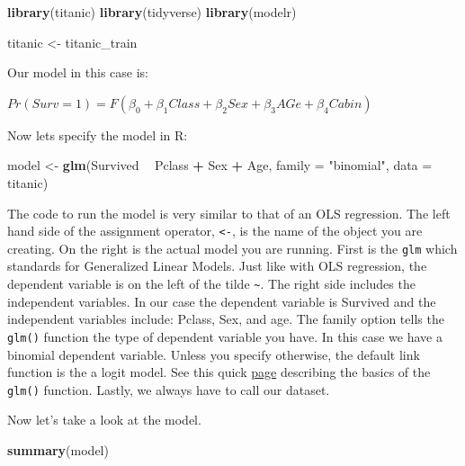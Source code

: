 \documentclass[]{book}
\newenvironment{Shaded}{\begin{snugshade}}{\end{snugshade}}
\newcommand{\KeywordTok}[1]{\textcolor[rgb]{0.13,0.29,0.53}{\textbf{#1}}}
\newcommand{\DataTypeTok}[1]{\textcolor[rgb]{0.13,0.29,0.53}{#1}}
\newcommand{\StringTok}[1]{\textcolor[rgb]{0.31,0.60,0.02}{#1}}
\newcommand{\OperatorTok}[1]{\textcolor[rgb]{0.81,0.36,0.00}{\textbf{#1}}}
\newcommand{\NormalTok}[1]{#1}
\begin{document}
\begin{Shaded}
\begin{Highlighting}[]
\KeywordTok{library}\NormalTok{(titanic)}
\KeywordTok{library}\NormalTok{(tidyverse)}
\KeywordTok{library}\NormalTok{(modelr)}

\NormalTok{titanic <-}\StringTok{ }\NormalTok{titanic_train}
\end{Highlighting}
\end{Shaded}

Our model in this case is:

\(Pr(Surv = 1) = F(\beta_0 + \beta_1Class + \beta_2Sex + \beta_3AGe + \beta_4Cabin)\)

Now lets specify the model in R:

\begin{Shaded}
\begin{Highlighting}[]
\NormalTok{model <-}\StringTok{ }\KeywordTok{glm}\NormalTok{(Survived }\OperatorTok{~}\StringTok{ }\NormalTok{Pclass }\OperatorTok{+}\StringTok{ }\NormalTok{Sex }\OperatorTok{+}\StringTok{ }\NormalTok{Age, }\DataTypeTok{family =} \StringTok{"binomial"}\NormalTok{, }\DataTypeTok{data =}\NormalTok{ titanic)}
\end{Highlighting}
\end{Shaded}

The code to run the model is very similar to that of an OLS regression.
The left hand side of the assignment operator, \texttt{\textless{}-}, is
the name of the object you are creating. On the right is the actual
model you are running. First is the \texttt{glm} which standards for
Generalized Linear Models. Just like with OLS regression, the dependent
variable is on the left of the tilde \texttt{\textasciitilde{}}. The
right side includes the independent variables. In our case the dependent
variable is Survived and the independent variables include: Pclass, Sex,
and age. The family option tells the \texttt{glm()} function the type of
dependent variable you have. In this case we have a binomial dependent
variable. Unless you specify otherwise, the default link function is the
a logit model. See this quick
\href{https://www.statmethods.net/advstats/glm.html}{page} describing
the basics of the \texttt{glm()} function. Lastly, we always have to
call our dataset.

Now let's take a look at the model.

\begin{Shaded}
\begin{Highlighting}[]
\KeywordTok{summary}\NormalTok{(model)}
\end{Highlighting}
\end{Shaded}
\end{document}

